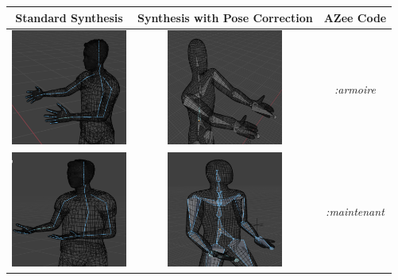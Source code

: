 \documentclass[../../main.tex]{subfiles}
\begin{document}
\begin{table}
  \centering
  \begin{tabular}{|c|c|c|}
    \hline
    \textbf{Standard Synthesis} & \textbf{Synthesis with Pose Correction} & \textbf{AZee Code} \\
    \hline
    \includegraphics[width = 1.5in]{chapters/pose_correction/images/standard_synthesis_armoire.png} & \includegraphics[width = 1.5in]{chapters/pose_correction/images/pose_correction_synthesis_armoire.png} & 
      \emph{:armoire} \\
    \hline
    \includegraphics[width = 1.5in]{chapters/pose_correction/images/standard_synthesis_maintenant.png} & \includegraphics[width = 1.5in]{chapters/pose_correction/images/pose_correction_synthesis_maintenant.png} &
      \emph{:maintenant} \\
    \hline

\end{tabular}
\end{table}
\end{document}
